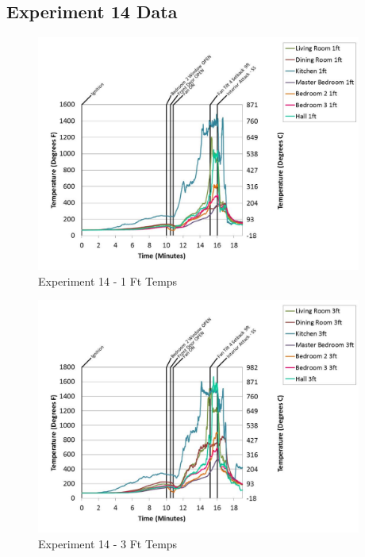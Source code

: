\documentclass{article}
\begin{document}
\begin{appendices}
		\clearpage
\clearpage		\large
\subsection{Experiment 14 Data} \label{App:Exp14Results} 

	\begin{figure}[h!]
		\centering
		\includegraphics[height=3.05in]{0_Images/Results_Charts/Exp_14_Charts/1FtTemps.pdf}
		\caption{Experiment 14 - 1 Ft Temps}
	\end{figure}
 

	\begin{figure}[h!]
		\centering
		\includegraphics[height=3.05in]{0_Images/Results_Charts/Exp_14_Charts/3FtTemps.pdf}
		\caption{Experiment 14 - 3 Ft Temps}
	\end{figure}
 
	\clearpage


\end{appendices}
\end{document}
